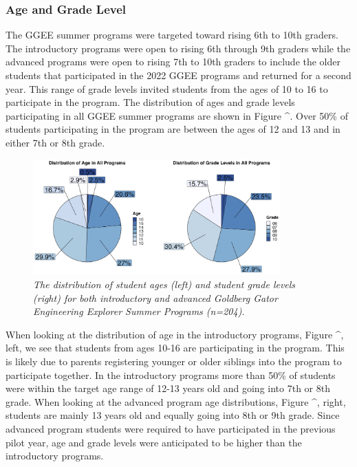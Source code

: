 \documentclass[
]{article}
\begin{document}
\hypertarget{age-and-grade-level}{%
\subsubsection{Age and Grade Level}\label{age-and-grade-level}}

The GGEE summer programs were targeted toward rising 6th to 10th
graders. The introductory programs were open to rising 6th through 9th
graders while the advanced programs were open to rising 7th to 10th
graders to include the older students that participated in the 2022 GGEE
programs and returned for a second year. This range of grade levels
invited students from the ages of 10 to 16 to participate in the
program. The distribution of ages and grade levels participating in all
GGEE summer programs are shown in Figure \^{}. Over 50\% of students
participating in the program are between the ages of 12 and 13 and in
either 7th or 8th grade.

\begin{figure}
\centering
\includegraphics[width=0.85\textwidth,height=\textheight]{Graphs/Report/GGEE_23_AgeGrade_All.jpg}
\caption{\emph{The distribution of student ages (left) and student grade
levels (right) for both introductory and advanced Goldberg Gator
Engineering Explorer Summer Programs (n=204).}}
\end{figure}

When looking at the distribution of age in the introductory programs,
Figure \^{}, left, we see that students from ages 10-16 are
participating in the program. This is likely due to parents registering
younger or older siblings into the program to participate together. In
the introductory programs more than 50\% of students were within the
target age range of 12-13 years old and going into 7th or 8th grade.
When looking at the advanced program age distributions, Figure \^{},
right, students are mainly 13 years old and equally going into 8th or
9th grade. Since advanced program students were required to have
participated in the previous pilot year, age and grade levels were
anticipated to be higher than the introductory programs.
\end{document}
